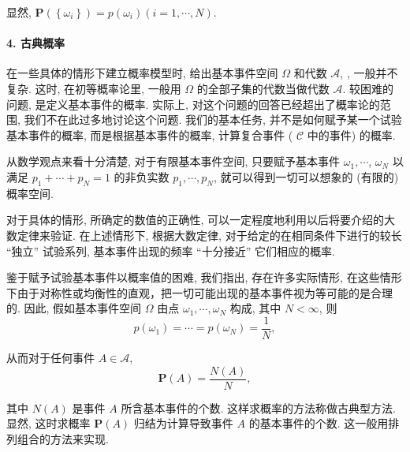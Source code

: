 显然, $\mathbf{P}\left(\left\{\omega_i\right\}\right)=p\left(\omega_i\right)(i=1, \cdots, N)$. 

\paragraph{4. 古典概率}在一些具体的情形下建立概率模型时, 给出基本事件空间 $\Omega$ 和代数 $\mathscr{A}$, , 一般并不复杂. 这时, 在初等概率论里, 一般用 $\Omega$ 的全部子集的代数当做代数 $\mathscr{A}$. 较困难的问题, 是定义基本事件的概率. 实际上, 对这个问题的回答已经超出了概率论的范围, 我们不在此过多地讨论这个问题. 我们的基本任务, 并不是如何赋予某一个试验基本事件的概率, 而是根据基本事件的概率, 计算复合事件 ( $\mathscr{C}$ 中的事件) 的概率.

从数学观点来看十分清楚, 对于有限基本事件空间, 只要赋予基本事件 $\omega_1, \cdots$, $\omega_N$ 以满足 $p_1+\cdots+p_N=1$ 的非负实数 $p_1, \cdots, p_N$, 就可以得到一切可以想象的 (有限的) 概率空间.

对于具体的情形, 所确定的数值的正确性, 可以一定程度地利用以后将要介绍的大数定律来验证. 在上述情形下, 根据大数定律, 对于给定的在相同条件下进行的较长 “独立” 试验系列, 基本事件出现的频率 “十分接近” 它们相应的概率.

鉴于赋予试验基本事件以概率值的困难, 我们指出, 存在许多实际情形, 在这些情形下由于对称性或均衡性的直观，把一切可能出现的基本事件视为等可能的是合理的. 因此, 假如基本事件空间 $\Omega$ 由点 $\omega_1, \cdots, \omega_N$ 构成, 其中 $N<\infty$, 则
$$
p\left(\omega_1\right)=\cdots=p\left(\omega_N\right)=\frac{1}{N},
$$

从而对于任何事件 $A \in \mathscr{A}$,
$$
\mathbf{P}(A)=\frac{N(A)}{N},
$$

其中 $N(A)$ 是事件 $A$ 所含基本事件的个数.
这样求概率的方法称做古典型方法. 显然, 这时求概率 $\mathbf{P}(A)$ 归结为计算导致事件 $A$ 的基本事件的个数. 这一般用排列组合的方法来实现. 